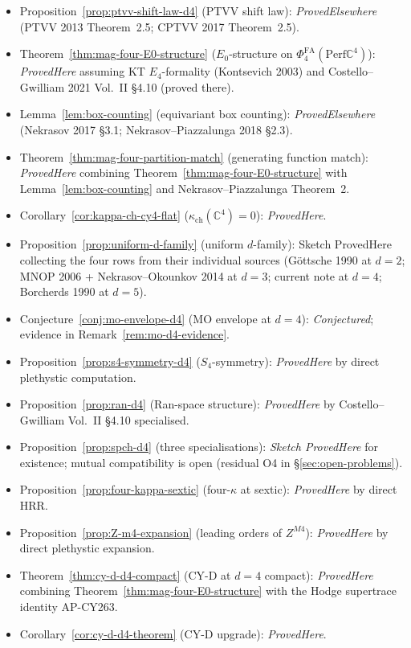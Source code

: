 \documentclass[11pt]{article}
\providecommand{\C}{\mathbb{C}}
\providecommand{\Perf}{\mathrm{Perf}}
\providecommand{\Ezero}{E_0}
\providecommand{\PhiFA}{\Phi^{\mathrm{FA}}}
\theoremstyle{definition}
\begin{document}
\begin{itemize}[leftmargin=2em]
  \item Proposition~\ref{prop:ptvv-shift-law-d4} (PTVV shift law):
  \emph{ProvedElsewhere} (PTVV 2013 Theorem~2.5; CPTVV 2017 Theorem~2.5).
  \item Theorem~\ref{thm:mag-four-E0-structure}
  ($\Ezero$-structure on $\PhiFA_4(\Perf \C^4)$):
  \emph{ProvedHere} assuming KT $E_4$-formality (Kontsevich 2003) and
  Costello--Gwilliam 2021 Vol.~II \S 4.10 (proved there).
  \item Lemma~\ref{lem:box-counting} (equivariant box counting):
  \emph{ProvedElsewhere} (Nekrasov 2017 \S 3.1; Nekrasov--Piazzalunga
  2018 \S 2.3).
  \item Theorem~\ref{thm:mag-four-partition-match} (generating function
  match): \emph{ProvedHere} combining Theorem~\ref{thm:mag-four-E0-structure}
  with Lemma~\ref{lem:box-counting} and Nekrasov--Piazzalunga Theorem~2.
  \item Corollary~\ref{cor:kappa-ch-cy4-flat}
  ($\kappa_{\mathrm{ch}}(\C^4) = 0$): \emph{ProvedHere}.
  \item Proposition~\ref{prop:uniform-d-family} (uniform $d$-family):
  Sketch ProvedHere collecting the four rows from their individual
  sources (G\"ottsche 1990 at $d = 2$; MNOP 2006 + Nekrasov--Okounkov
  2014 at $d = 3$; current note at $d = 4$; Borcherds 1990 at $d = 5$).
  \item Conjecture~\ref{conj:mo-envelope-d4} (MO envelope at $d = 4$):
  \emph{Conjectured}; evidence in Remark~\ref{rem:mo-d4-evidence}.
  \item Proposition~\ref{prop:s4-symmetry-d4} ($S_4$-symmetry):
  \emph{ProvedHere} by direct plethystic computation.
  \item Proposition~\ref{prop:ran-d4} (Ran-space structure):
  \emph{ProvedHere} by Costello--Gwilliam Vol.~II \S 4.10 specialised.
  \item Proposition~\ref{prop:spch-d4} (three specialisations):
  \emph{Sketch ProvedHere} for existence; mutual compatibility
  is open (residual O4 in \S\ref{sec:open-problems}).
  \item Proposition~\ref{prop:four-kappa-sextic} (four-$\kappa$ at sextic):
  \emph{ProvedHere} by direct HRR.
  \item Proposition~\ref{prop:Z-m4-expansion} (leading orders of $Z^{M4}$):
  \emph{ProvedHere} by direct plethystic expansion.
  \item Theorem~\ref{thm:cy-d-d4-compact} (CY-D at $d = 4$ compact):
  \emph{ProvedHere} combining Theorem~\ref{thm:mag-four-E0-structure}
  with the Hodge supertrace identity AP-CY263.
  \item Corollary~\ref{cor:cy-d-d4-theorem} (CY-D upgrade):
  \emph{ProvedHere}.
\end{itemize}
\end{document}
